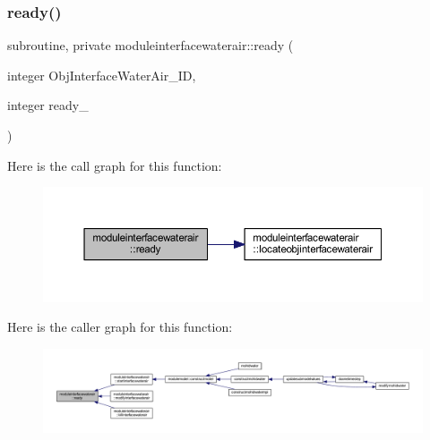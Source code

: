 \subsubsection{\texorpdfstring{ready()}{ready()}}
{\footnotesize\ttfamily subroutine, private moduleinterfacewaterair\+::ready (\begin{DoxyParamCaption}\item[{integer}]{Obj\+Interface\+Water\+Air\+\_\+\+ID,  }\item[{integer}]{ready\+\_\+ }\end{DoxyParamCaption})\hspace{0.3cm}{\ttfamily [private]}}

Here is the call graph for this function\+:\nopagebreak
\begin{figure}[H]
\begin{center}
\leavevmode
\includegraphics[width=350pt]{namespacemoduleinterfacewaterair_a519b1351dce06ffef1eb101335e6361f_cgraph}
\end{center}
\end{figure}
Here is the caller graph for this function\+:\nopagebreak
\begin{figure}[H]
\begin{center}
\leavevmode
\includegraphics[width=350pt]{namespacemoduleinterfacewaterair_a519b1351dce06ffef1eb101335e6361f_icgraph}
\end{center}
\end{figure}
\mbox{\label{namespacemoduleinterfacewaterair_abba77353f44ae39342d577e54d38ad95}} 
